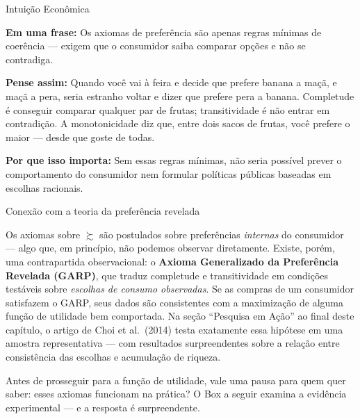 \documentclass[11pt,twoside,openright]{book}
\begin{document}
\begin{intuitionbox}{Intuição Econômica}

\textbf{Em uma frase:} Os axiomas de preferência são apenas regras
mínimas de coerência --- exigem que o consumidor saiba comparar opções e
não se contradiga.

\textbf{Pense assim:} Quando você vai à feira e decide que prefere
banana a maçã, e maçã a pera, seria estranho voltar e dizer que prefere
pera a banana. Completude é conseguir comparar qualquer par de frutas;
transitividade é não entrar em contradição. A monotonicidade diz que,
entre dois sacos de frutas, você prefere o maior --- desde que goste de
todas.

\textbf{Por que isso importa:} Sem essas regras mínimas, não seria
possível prever o comportamento do consumidor nem formular políticas
públicas baseadas em escolhas racionais.

\end{intuitionbox}

\begin{notebox}{Conexão com a teoria da preferência revelada}

Os axiomas sobre \(\succsim\) são postulados sobre preferências
\emph{internas} do consumidor --- algo que, em princípio, não podemos
observar diretamente. Existe, porém, uma contrapartida observacional: o
\textbf{Axioma Generalizado da Preferência Revelada (GARP)}, que traduz
completude e transitividade em condições testáveis sobre \emph{escolhas
de consumo observadas}. Se as compras de um consumidor satisfazem o
GARP, seus dados são consistentes com a maximização de alguma função de
utilidade bem comportada. Na seção ``Pesquisa em Ação'' ao final deste
capítulo, o artigo de Choi et al.~(2014) testa exatamente essa hipótese
em uma amostra representativa --- com resultados surpreendentes sobre a
relação entre consistência das escolhas e acumulação de riqueza.

\end{notebox}

Antes de prosseguir para a função de utilidade, vale uma pausa para quem
quer saber: esses axiomas funcionam na prática? O Box a seguir examina a
evidência experimental --- e a resposta é surpreendente.
\end{document}

